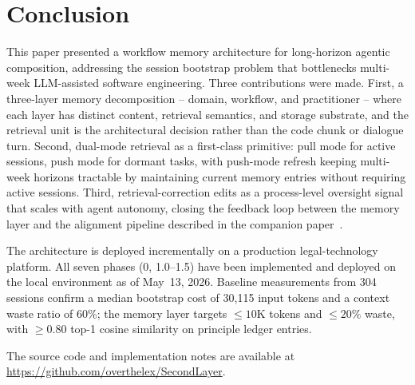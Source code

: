 \documentclass[11pt]{article}
\begin{document}
\section{Conclusion}
\label{sec:conclusion}

This paper presented a workflow memory architecture for long-horizon agentic composition, addressing the session bootstrap problem that bottlenecks multi-week LLM-assisted software engineering.
Three contributions were made.
First, a three-layer memory decomposition -- domain, workflow, and practitioner -- where each layer has distinct content, retrieval semantics, and storage substrate, and the retrieval unit is the architectural decision rather than the code chunk or dialogue turn.
Second, dual-mode retrieval as a first-class primitive: pull mode for active sessions, push mode for dormant tasks, with push-mode refresh keeping multi-week horizons tractable by maintaining current memory entries without requiring active sessions.
Third, retrieval-correction edits as a process-level oversight signal that scales with agent autonomy, closing the feedback loop between the memory layer and the alignment pipeline described in the companion paper~\citep{ovcharov2026recursive}.

The architecture is deployed incrementally on a production legal-technology platform.
All seven phases (0, 1.0--1.5) have been implemented and deployed on the local environment as of May~13, 2026.
Baseline measurements from 304 sessions confirm a median bootstrap cost of 30{,}115 input tokens and a context waste ratio of 60\%; the memory layer targets ${\leq}10$K tokens and ${\leq}20\%$ waste, with ${\geq}0.80$ top-1 cosine similarity on principle ledger entries.

The source code and implementation notes are available at \url{https://github.com/overthelex/SecondLayer}.




\end{document}
